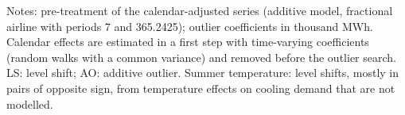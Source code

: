 \documentclass[10pt]{article}
\begin{document}
\vspace{8pt}
\noindent\begin{minipage}{\textwidth}
\footnotesize
Notes: pre-treatment of the calendar-adjusted series (additive model, fractional airline with periods 7 and 365.2425); outlier coefficients in thousand MWh. Calendar effects are estimated in a first step with time-varying coefficients (random walks with a common variance) and removed before the outlier search. LS: level shift; AO: additive outlier. Summer temperature: level shifts, mostly in pairs of opposite sign, from temperature effects on cooling demand that are not modelled.
\end{minipage}
\end{document}
